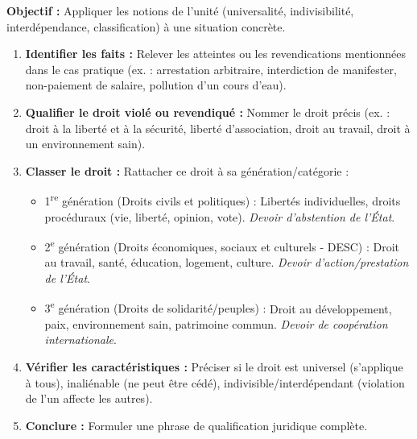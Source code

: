 \documentclass[11pt]{article}
\newcommand{\cle}[1]{{\popxbold\color{popdark}#1}}
\begin{document}
\begin{methode}
    \textbf{Objectif :} Appliquer les notions de l'unité (universalité, indivisibilité, interdépendance, classification) à une situation concrète.
    \begin{enumerate}
        \item \textbf{Identifier les faits :} Relever les atteintes ou les revendications mentionnées dans le cas pratique (ex. : arrestation arbitraire, interdiction de manifester, non-paiement de salaire, pollution d'un cours d'eau).
        \item \textbf{Qualifier le droit violé ou revendiqué :} Nommer le droit précis (ex. : droit à la liberté et à la sécurité, liberté d'association, droit au travail, droit à un environnement sain).
        \item \textbf{Classer le droit :} Rattacher ce droit à sa génération/catégorie :
            \begin{itemize}
                \item \cle{1\textsuperscript{re} génération (Droits civils et politiques) :} Libertés individuelles, droits procéduraux (vie, liberté, opinion, vote). \emph{Devoir d'abstention de l'État}.
                \item \cle{2\textsuperscript{e} génération (Droits économiques, sociaux et culturels - DESC) :} Droit au travail, santé, éducation, logement, culture. \emph{Devoir d'action/prestation de l'État}.
                \item \cle{3\textsuperscript{e} génération (Droits de solidarité/peuples) :} Droit au développement, paix, environnement sain, patrimoine commun. \emph{Devoir de coopération internationale}.
            \end{itemize}
        \item \textbf{Vérifier les caractéristiques :} Préciser si le droit est \cle{universel} (s'applique à tous), \cle{inaliénable} (ne peut être cédé), \cle{indivisible/interdépendant} (violation de l'un affecte les autres).
        \item \textbf{Conclure :} Formuler une phrase de qualification juridique complète.
    \end{enumerate}
\end{methode}
\end{document}
